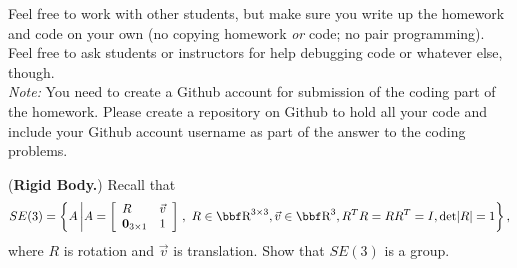 \documentclass[12pt,letterpaper]{hmcpset}
\begin{document}
Feel free to work with other students, but make sure you write up the homework
and code on your own (no copying homework \textit{or} code; no pair programming).
Feel free to ask students or instructors for help debugging code or whatever else,
though.\\

\textit{Note:} You need to create a Github account for submission of the coding part of the homework. Please create a repository on Github to hold all your code and include your Github account username as part of the answer to the coding problems.

\begin{problem}[1]
(\textbf{Rigid Body.}) Recall that 
$$SE(3)=\left\{A\left|A=
\left[\begin{array}{ll}
R & \vec v\\
\textbf 0_{3\times1} & 1
\end{array}\right]\right., ~R\in \RR^{3\times 3}, \vec v\in \RR^3, R^TR=RR^T=I, \det|R|=1\right\},$$
where $R$ is rotation and $\vec v$ is translation. 
Show that $SE(3)$ is a group.
\end{problem}
\begin{solution}
    \vfill
\end{solution}
\newpage
\end{document}
